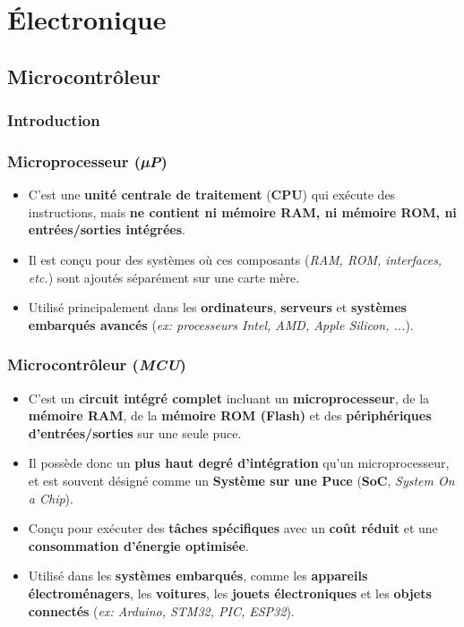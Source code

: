 \chapter{Électronique} \label{electronique}
\section{Microcontrôleur}

\subsection{Introduction}

\subsection{Microprocesseur (\textit{µP})}
\begin{itemize}
    \item C'est une \textbf{unité centrale de traitement} (\textbf{CPU}) qui exécute des instructions, mais \textbf{ne contient ni mémoire RAM, ni mémoire ROM, ni entrées/sorties intégrées}.
    \item Il est conçu pour des systèmes où ces composants (\textit{RAM, ROM, interfaces, etc.}) sont ajoutés séparément sur une carte mère.
    \item Utilisé principalement dans les \textbf{ordinateurs}, \textbf{serveurs} et \textbf{systèmes embarqués avancés} (\textit{ex: processeurs Intel, AMD, Apple Silicon, ...}).
\end{itemize}

\subsection{Microcontrôleur (\textit{MCU})}
\begin{itemize}
    \item C'est un \textbf{circuit intégré complet} incluant un \textbf{microprocesseur}, de la \textbf{mémoire RAM}, de la \textbf{mémoire ROM (Flash)} et des \textbf{périphériques d'entrées/sorties} sur une seule puce.
    \item Il possède donc un \textbf{plus haut degré d'intégration} qu'un microprocesseur, et est souvent désigné comme un \textbf{Système sur une Puce} (\textbf{SoC}, \textit{System On a Chip}).
    \item Conçu pour exécuter des \textbf{tâches spécifiques} avec un \textbf{coût réduit} et une \textbf{consommation d'énergie optimisée}.
    \item Utilisé dans les \textbf{systèmes embarqués}, comme les \textbf{appareils électroménagers}, les \textbf{voitures}, les \textbf{jouets électroniques} et les \textbf{objets connectés} (\textit{ex: Arduino, STM32, PIC, ESP32}).
\end{itemize}

